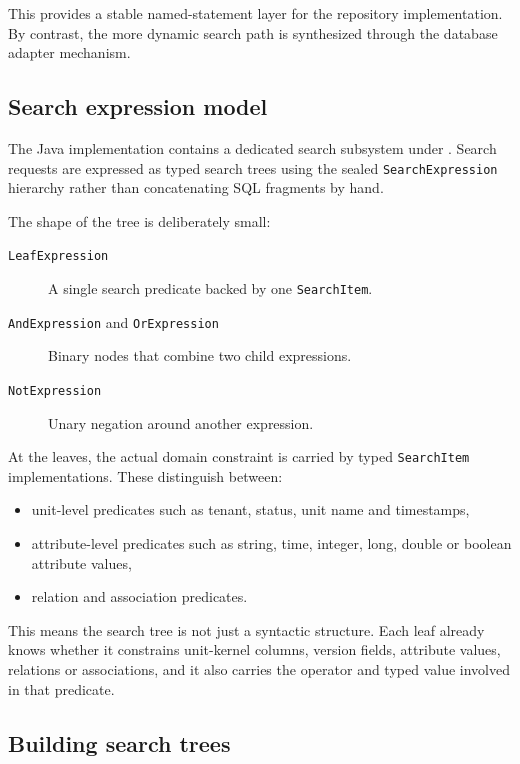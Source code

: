 This provides a stable named-statement layer for the repository implementation. By contrast, the more dynamic search path is synthesized through the database adapter mechanism.

\subsection{Search expression model}

The Java implementation contains a dedicated search subsystem under . Search requests are expressed as typed search trees using the sealed \texttt{SearchExpression} hierarchy rather than concatenating SQL fragments by hand.

The shape of the tree is deliberately small:
\begin{description}
\item[\texttt{LeafExpression}] A single search predicate backed by one \texttt{SearchItem}.
\vspace{.2cm}
\item[\texttt{AndExpression} and \texttt{OrExpression}] Binary nodes that combine two child expressions.
\vspace{.2cm}
\item[\texttt{NotExpression}] Unary negation around another expression.
\end{description}

At the leaves, the actual domain constraint is carried by typed \texttt{SearchItem} implementations. These distinguish between:
\begin{itemize}
\item unit-level predicates such as tenant, status, unit name and timestamps,
\item attribute-level predicates such as string, time, integer, long, double or boolean attribute values,
\item relation and association predicates.
\end{itemize}

This means the search tree is not just a syntactic structure. Each leaf already knows whether it constrains unit-kernel columns, version fields, attribute values, relations or associations, and it also carries the operator and typed value involved in that predicate.

\subsection{Building search trees}

